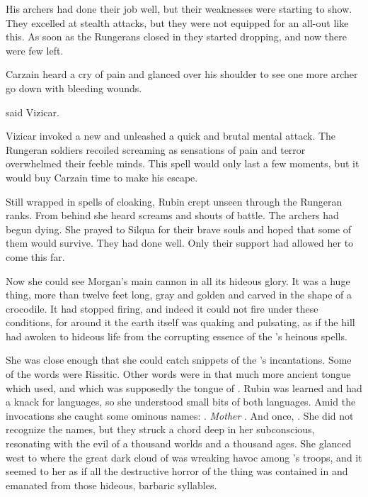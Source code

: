 
His archers had done their job well, but their weaknesses were starting to show. 
They excelled at stealth attacks, but they were not equipped for an all-out \melee like this. 
As soon as the Rungerans closed in they started dropping, and now there were few left. 

Carzain heard a cry of pain and glanced over his shoulder to see one more archer go down with bleeding wounds. 

 said Vizicar.

Vizicar invoked a new \qliphah and unleashed a quick and brutal mental attack. 
The Rungeran soldiers recoiled screaming as sensations of pain and terror overwhelmed their feeble minds. 
This spell would only last a few moments, but it would buy Carzain time to make his escape. 






\begin{comment}
  \subsection{Sanyor's last spell}
\end{comment}
\new
Still wrapped in spells of cloaking, Rubin \Sanyor crept unseen through the Rungeran ranks. 
From behind she heard screams and shouts of battle.
The archers had begun dying. 
She prayed to Silqua for their brave souls and hoped that some of them would survive. 
They had done well. 
Only their support had allowed her to come this far. 

Now she could see Morgan's main cannon in all its hideous glory. 
It was a huge thing, more than twelve feet long, gray and golden and carved in the shape of a crocodile. 
It had stopped firing, and indeed it could not fire under these conditions, for around it the earth itself was quaking and pulsating, as if the hill had awoken to hideous life from the corrupting essence of the \ishrah's heinous spells. 

She was close enough that she could catch snippets of the \ishrah's incantations. 
Some of the words were Rissitic. 
Other words were in that much more ancient tongue which \Ortaican \rethyaxes used, and which was supposedly the tongue of \dragons. 
Rubin was learned and had a knack for languages, so she understood small bits of both languages. 
Amid the invocations she caught some ominous names: 
\emph{\KhothSell{}}. 
\emph{Mother \KhothSell{}}. 
And once, \emph{\NaathKurRamalech{}}. 
She did not recognize the names, but they struck a chord deep in her subconscious, resonating with the evil of a thousand worlds and a thousand ages. 
She glanced west to where the great dark cloud of \daemons was wreaking havoc among \Dornaer's troops, and it seemed to her as if all the destructive horror of the thing was contained in and emanated from those hideous, barbaric syllables. 

